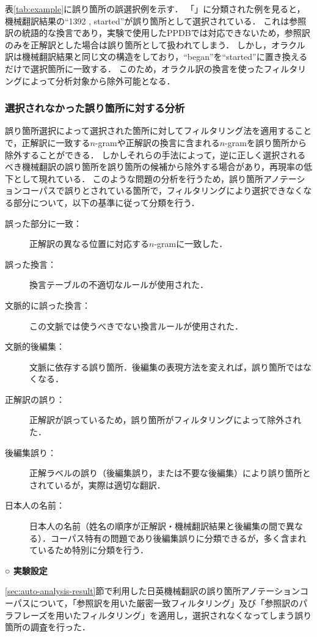 \documentclass[japanese]{jnlp_1.4}
\newcommand{\textcolor}[2]{}
\begin{document}
表\ref{tab:example}に誤り箇所の誤選択例を示す．
「\textcolor{black}{統語的換言}」に分類された例を見ると，機械翻訳結果の``1392 , started''が誤り箇所として選択されている．
これは参照訳の統語的な換言であり，実験で使用したPPDBでは対応できないため，参照訳のみを正解訳とした場合は誤り箇所として扱われてしまう．
しかし，オラクル訳は機械翻訳結果と同じ文の構造をしており，``began''を``started''に置き換えるだけで選択箇所に一致する．
このため，オラクル訳の換言を使ったフィルタリングによって分析対象から除外可能となる．


\subsubsection{選択されなかった誤り箇所に対する分析}

誤り箇所選択によって選択された箇所に対してフィルタリング法を適用することで，正解訳に一致する$n$-gramや正解訳の換言に含まれる$n$-gramを誤り箇所から除外することができる．
しかしそれらの手法によって，逆に正しく選択されるべき機械翻訳の誤り箇所を誤り箇所の候補から除外する場合があり，再現率の低下として現れている．
このような問題の分析を行うため，誤り箇所アノテーションコーパスで誤りとされている箇所で，フィルタリングにより選択できなくなる部分について，以下の基準に従って分類を行う．

\begin{description}
\item[誤った部分に一致：] 正解訳の異なる位置に対応する$n$-gramに一致した．
\item[誤った換言：] 換言テーブルの不適切なルールが使用された．
\item[文脈的に誤った換言：] この文脈では使うべきでない換言ルールが使用された．
\item[文脈的後編集：] 文脈に依存する誤り箇所．後編集の表現方法を変えれば，誤り箇所ではなくなる．
\item[正解訳の誤り：] 正解訳が誤っているため，誤り箇所がフィルタリングによって除外された．
\item[後編集誤り：] 正解ラベルの誤り（後編集誤り，または不要な後編集）により誤り箇所とされているが，実際は適切な翻訳．
\item[日本人の名前：] 日本人の名前（姓名の順序が正解訳・機械翻訳結果と後編集の間で異なる）．コーパス特有の問題であり後編集誤りに分類できるが，多く含まれているため特別に分類を行う．
\end{description}

\vspace{1\Cvs}
\noindent \textbf{○ 実験設定}

\ref{sec:auto-analysis-result}節で利用した日英機械翻訳の誤り箇所アノテーションコーパスについて，「参照訳を用いた厳密一致フィルタリング」及び「参照訳のパラフレーズを用いたフィルタリング」を適用し，選択されなくなってしまう誤り箇所の調査を行った．
\end{document}

